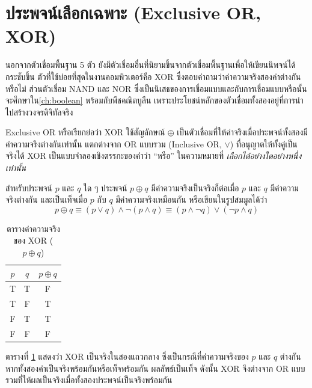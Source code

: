 \section{ประพจน์เลือกเฉพาะ (Exclusive OR, XOR)}
\label{sec:xor}

นอกจากตัวเชื่อมพื้นฐาน 5 ตัว ยังมีตัวเชื่อมอื่นที่นิยามขึ้นจากตัวเชื่อมพื้นฐานเพื่อให้เขียนนิพจน์ได้กระชับขึ้น ตัวที่ใช้บ่อยที่สุดในงานคอมพิวเตอร์คือ XOR ซึ่งตอบคำถามว่าค่าความจริงสองค่าต่างกันหรือไม่ ส่วนตัวเชื่อม NAND และ NOR ซึ่งเป็นนิเสธของการเชื่อมแบบและกับการเชื่อมแบบหรือนั้น จะศึกษาใน\autoref{ch:boolean} พร้อมกับพีชคณิตบูลีน เพราะประโยชน์หลักของตัวเชื่อมทั้งสองอยู่ที่การนำไปสร้างวงจรดิจิทัลจริง~\parencite{copi2014logic}

Exclusive OR หรือเรียกย่อว่า XOR ใช้สัญลักษณ์ $\oplus$ เป็นตัวเชื่อมที่ให้ค่าจริงเมื่อประพจน์ทั้งสองมีค่าความจริงต่างกันเท่านั้น แตกต่างจาก OR แบบรวม (Inclusive OR, $\lor$) ที่อนุญาตให้ทั้งคู่เป็นจริงได้ XOR เป็นแบบจำลองเชิงตรรกะของคำว่า ``หรือ'' ในความหมายที่ \textit{เลือกได้อย่างใดอย่างหนึ่งเท่านั้น}~\parencite{hurley2024logic}

\begin{definition}
สำหรับประพจน์ $p$ และ $q$ ใด ๆ ประพจน์ $p \oplus q$ มีค่าความจริงเป็นจริงก็ต่อเมื่อ $p$ และ $q$ มีค่าความจริงต่างกัน และเป็นเท็จเมื่อ $p$ กับ $q$ มีค่าความจริงเหมือนกัน หรือเขียนในรูปสมมูลได้ว่า
\begin{equation}
p \oplus q \equiv (p \lor q) \land \neg(p \land q) \equiv (p \land \neg q) \lor (\neg p \land q)
\end{equation}
\end{definition}

\begin{table}[H]
    \centering
    \caption{ตารางค่าความจริงของ XOR ($p \oplus q$)}
    \label{tab:xor-truth}
    \begin{tabular}{|c|c|c|}
        \hline
        \textbf{$p$} & \textbf{$q$} & \textbf{$p \oplus q$} \\ \hline
        T & T & F \\ \hline
        T & F & T \\ \hline
        F & T & T \\ \hline
        F & F & F \\ \hline
    \end{tabular}
\end{table}

ตารางที่ \ref{tab:xor-truth} แสดงว่า XOR เป็นจริงในสองแถวกลาง ซึ่งเป็นกรณีที่ค่าความจริงของ $p$ และ $q$ ต่างกัน หากทั้งสองค่าเป็นจริงพร้อมกันหรือเท็จพร้อมกัน ผลลัพธ์เป็นเท็จ ดังนั้น XOR จึงต่างจาก OR แบบรวมที่ให้ผลเป็นจริงเมื่อทั้งสองประพจน์เป็นจริงพร้อมกัน

